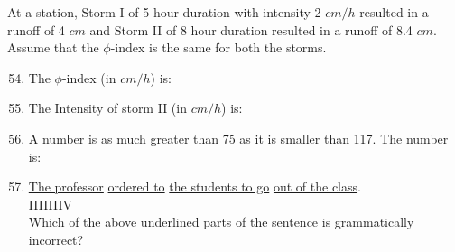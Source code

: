 \documentclass[journal,12pt,onecolumn]{IEEEtran}
\theoremstyle{remark}
\begin{document}
At a station, Storm I of 5 hour duration with intensity 2 $cm/h$ resulted in a runoff of 4 $cm$ and Storm II of 8
hour duration resulted in a runoff of 8.4 $cm$. Assume that the $\phi$-index is the same for both the storms.
\begin{enumerate}
\setcounter{enumi}{53}
\item The $\phi$-index (in $cm/h$) is:
\begin{enumerate}
\end{enumerate}
\item  The Intensity of storm II (in $cm/h$) is:
\begin{enumerate}
\end{enumerate}
\item A number is as much greater than 75 as it is smaller than 117. The number is:
\begin{enumerate}
\end{enumerate}
\item \underline{The professor} \underline{ordered to} \underline{the students to go} \underline{out of the class}.\\
\hspace{3cm}I\hspace{3cm}II\hspace{2cm}III\hspace{3cm}IV\\
Which of the above underlined parts of the sentence is grammatically incorrect?
\begin{enumerate}
\end{enumerate}
\end{enumerate}
\end{document}
